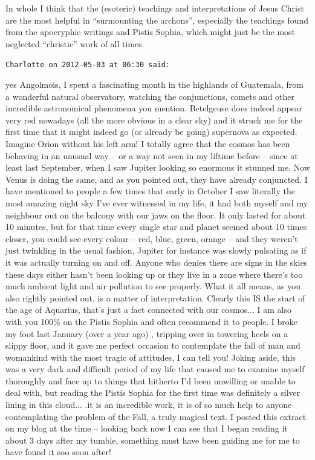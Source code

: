 \begin{footnotesize}
\begin{sffamily}
In whole I think that the (esoteric) teachings and interpretations of Jesus Christ are the most helpful in ``surmounting the archons'', especially the teachings found from the apocryphic writings and Pistis Sophia, which might just be the most neglected ``christic'' work of all times.

\hfill

\texttt{Charlotte on 2012-05-03 at 06:30 said:}

yes Angolmois, I spent a fascinating month in the highlands of Guatemala, from a wonderful natural observatory, watching the conjunctions, comets and other incredible astronomical phenomena you mention. Betelgeuse does indeed appear very red nowadays (all the more obvious in a clear sky) and it struck me for the first time that it might indeed go (or already be going) supernova as expected. Imagine Orion without his left arm! I totally agree that the cosmos has been behaving in an unusual way -- or a way not seen in my liftime before -- since at least last September, when I saw Jupiter looking so enormous it stunned me. Now Venus is doing the same, and as you pointed out, they have already conjuncted. I have mentioned to people a few times that early in October I saw literally the most amazing night sky I've ever witnessed in my life, it had both myself and my neighbour out on the balcony with our jaws on the floor. It only lasted for about 10 minutes, but for that time every single star and planet seemed about 10 times closer, you could see every colour -- red, blue, green, orange -- and they weren't just twinkling in the usual fashion, Jupiter for instance was slowly pulsating as if it was actually turning on and off. Anyone who denies there are signs in the skies these days either hasn't been looking up or they live in a zone where there's too much ambient light and air pollution to see properly. What it all means, as you also rightly pointed out, is a matter of interpretation. Clearly this IS the start of the age of Aquarius, that's just a fact connected with our cosmos... I am also with you 100\% on the Pistis Sophia and often recommend it to people. I broke my foot last January (over a year ago) , tripping over in towering heels on a slippy floor, and it gave me perfect occasion to contemplate the fall of man and womankind with the most tragic of attitudes, I can tell you! Joking aside, this was a very dark and difficult period of my life that caused me to examine myself thoroughly and face up to things that hitherto I'd been unwilling or unable to deal with, but reading the Pistis Sophia for the first time was definitely a silver lining in this cloud... .it is an incredible work, it is of so much help to anyone contemplating the problem of the Fall, a truly magical text. I posted this extract on my blog at the time -- looking back now I can see that I began reading it about 3 days after my tumble, something must have been guiding me for me to have found it soo soon after!


\end{sffamily}
\end{footnotesize}
